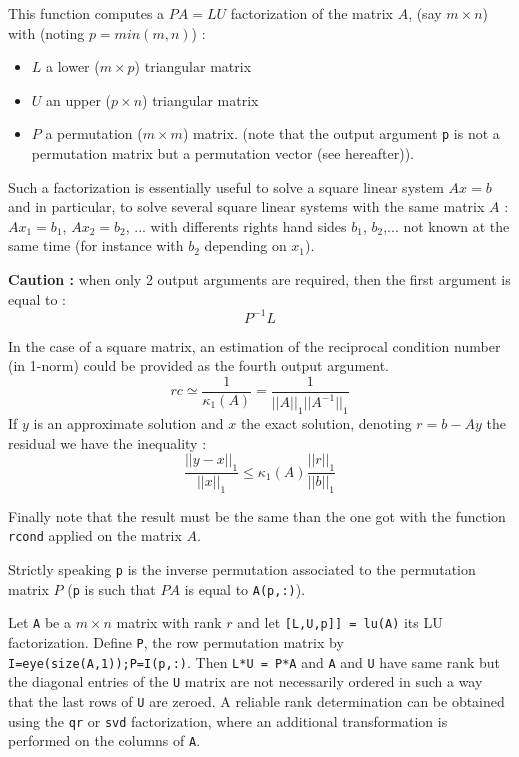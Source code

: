 \begin{mandescription}
This function computes a $P A = L U$ factorization of the matrix $A$, 
(say $m \times n$) with (noting $p = min(m,n)$) :
\begin{itemize}
\item $L$ a lower  ($m \times p$) triangular matrix
\item $U$ an upper  ($p \times n$) triangular matrix
\item $P$ a permutation  ($m \times m$) matrix.
      (note that the output argument \verb+p+ is not a permutation matrix
       but a permutation vector (see hereafter)). 
\end{itemize}
Such a factorization is essentially useful to solve a square linear
system $A x = b$ and in particular, to solve several square linear
systems with the same matrix $A$ : $Ax_1=b_1$, $Ax_2 = b_2$, ... with
differents rights hand sides $b_1$, $b_2$,... not known at the same
time (for instance with $b_2$ depending on $x_1$). 

{\bf Caution :} when only 2 output arguments are required, then the first argument is
equal to :
$$
P^{-1}L
$$



In the case of a square matrix, an estimation of the reciprocal
condition number (in 1-norm) could be provided as the fourth output argument.
$$
rc \simeq \frac{1}{\kappa_1(A)} = \frac{1}{||A||_1 ||A^{-1}||_1}
$$
If $y$ is an approximate solution and $x$ the exact solution,
denoting $r = b - A y$ the residual we have the inequality :
$$
\frac{|| y - x||_1}{||x||_1} \le \kappa_1(A) \frac{||r||_1}{||b||_1}
$$
 
Finally note that the result must be the same than the one got 
with the function \verb+rcond+ applied on the matrix $A$.
 
Strictly speaking \verb+p+ is the inverse permutation associated
to the permutation matrix $P$ (\verb+p+ is such that $PA$ is equal 
to \verb+A(p,:)+).

Let \verb!A! be a $m \times n$ matrix with rank $r$ and let \verb![L,U,p]] = lu(A)! its LU factorization. 
Define \verb!P!, the row permutation matrix by \verb!I=eye(size(A,1));P=I(p,:)!. Then \verb!L*U = P*A! and 
\verb!A! and \verb!U! have same rank but the diagonal entries of the \verb!U! matrix are not necessarily 
ordered in such a way that the last rows of \verb!U! are zeroed.
A reliable rank determination can be obtained using the \verb!qr! or \verb!svd! factorization, 
where an additional transformation is performed on the columns of \verb!A!.
\end{mandescription}

